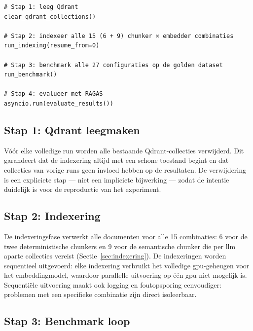 \begin{listing}[H]
\begin{verbatim}
# Stap 1: leeg Qdrant
clear_qdrant_collections()

# Stap 2: indexeer alle 15 (6 + 9) chunker × embedder combinaties
run_indexing(resume_from=0)

# Stap 3: benchmark alle 27 configuraties op de golden dataset
run_benchmark()

# Stap 4: evalueer met RAGAS
asyncio.run(evaluate_results())
\end{verbatim}
\caption[run\_pipeline.py: volledig geautomatiseerde sequentiële uitvoering]{Het hoofdscript voert alle vier stappen automatisch achter elkaar uit. Elke run begint met een schone Qdrant-database om het reproduceerbaarheid-requirement (Tabel~\ref{tab:moscow}) te garanderen.}
\label{lst:run-pipeline}
\end{listing}

\subsection{Stap 1: Qdrant leegmaken}

Vóór elke volledige run worden alle bestaande Qdrant-collecties verwijderd. Dit garandeert dat de indexering altijd met een schone toestand begint en dat collecties van vorige runs geen invloed hebben op de resultaten. De verwijdering is een expliciete stap — niet een impliciete bijwerking — zodat de intentie duidelijk is voor de reproductie van het experiment.

\subsection{Stap 2: Indexering}

De indexeringsfase verwerkt alle documenten voor alle 15 combinaties: 6 voor de twee deterministische chunkers en 9 voor de semantische chunker die per \gls{llm} aparte collecties vereist (Sectie~\ref{sec:indexering}). De indexeringen worden sequentieel uitgevoerd: elke indexering verbruikt het volledige \gls{gpu}-geheugen voor het embeddingmodel, waardoor parallelle uitvoering op één \gls{gpu} niet mogelijk is. Sequentiële uitvoering maakt ook logging en foutopsporing eenvoudiger: problemen met een specifieke combinatie zijn direct isoleerbaar.

\subsection{Stap 3: Benchmark loop}
\label{subsec:benchmarkloop}

